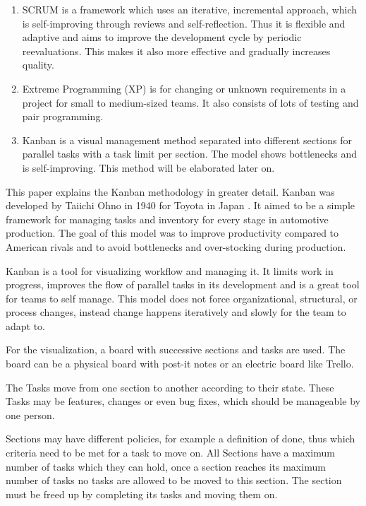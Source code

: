 \documentclass[runningheads]{llncs}
\begin{document}
\begin{enumerate}
  \item SCRUM is a framework which uses an iterative, incremental approach, which is self-improving through reviews and self-reflection. 
  Thus it is flexible and adaptive and aims to improve the development cycle by periodic reevaluations. This makes it also more 
  effective and gradually increases quality.
  \item Extreme Programming (XP) is for changing or unknown requirements in a project for small to medium-sized teams. It also consists
  of lots of testing and pair programming.
  \item Kanban is a visual management method separated into different sections for parallel tasks with a task limit per section. The model 
  shows bottlenecks and is self-improving. This method will be elaborated later on.
\end{enumerate}

This paper explains the Kanban methodology in greater detail. Kanban was developed by Taiichi Ohno in 1940 for Toyota in Japan \cite{ref_kanban}. 
It aimed to be a simple framework for managing tasks and inventory for every stage in automotive production. The goal of this model 
was to improve productivity compared to American rivals and to avoid bottlenecks and over-stocking during production. 

Kanban is a tool for visualizing workflow and managing it. It limits work in progress, improves the flow of parallel tasks in its development 
and is a great tool for teams to self manage. This model does not force organizational, structural, or process changes, instead change happens 
iteratively and slowly for the team to adapt to.

For the visualization, a board with successive sections and tasks are used. The board can be a physical board with post-it notes or an electric board like Trello. 

The Tasks move from one section to another according to their state. These Tasks may be features, changes or even bug fixes, which should be 
manageable by one person. 

Sections may have different policies, for example a definition of done, thus which criteria need to be met for a task to move on. All Sections
have a maximum number of tasks which they can hold, once a section reaches its maximum number of tasks no tasks are allowed to be moved to 
this section. The section must be freed up by completing its tasks and moving them on.
\end{document}
